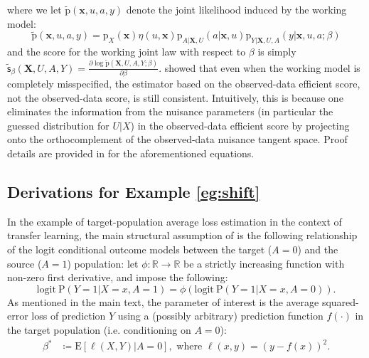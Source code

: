 \documentclass{article}
\def\logit{\mathrm{logit}}
\def\bfX{\mathbf{X}}
\def\bfx{\mathbf{x}}
\def\sfs{\mathsf{s}}
\theoremstyle{plain}
\theoremstyle{definition}
\theoremstyle{remark}
\def\P{\mathrm{P}}
\def\E{\mathrm{E}}
\def\tilde{\widetilde}
\def\p{\mathrm{p}}
\def\bbR{\mathbb{R}}
\begin{document}
where we let $\tilde{\p} (\bfx, u, a, y)$ denote the joint likelihood induced by the working model:
$$\tilde{\p} (\bfx, u, a, y) = \p_{X} (\bfx) \eta (u, \bfx) \p_{A | \bfX, U} (a | \bfx, u) \p_{Y | \bfX, U, A} (y | \bfx, u, a; \beta)$$ 
and the score for the working joint law with respect to $\beta$ is simply $\tilde{\sfs}_{\beta} (\bfX, U, A, Y) = \frac{\partial \log \tilde{\p} (\bfX, U, A, Y; \beta)}{\partial \beta}$.
\citet{zhang2022semi} showed that even when the working model is completely misspecified, the estimator based on the observed-data efficient score, not the observed-data score, is still consistent. Intuitively, this is because one eliminates the information from the nuisance parameters (in particular the guessed distribution for $U | X$) in the observed-data efficient score by projecting onto the orthocomplement of the observed-data nuisance tangent space. Proof details are provided in \citet{zhang2022semi} for the aforementioned equations.

\subsection{Derivations for Example \ref{eg:shift}}
\label{app:Proof_transfer}

In the example of target-population average loss estimation in the context of transfer learning, the main structural assumption of \citet{qiu2023efficient} is the following relationship of the logit conditional outcome models between the target ($A = 0$) and the source ($A = 1$) population: let $\phi: \bbR \rightarrow \bbR$ be a strictly increasing function with non-zero first derivative, and \citet{qiu2023efficient} impose the following:
\begin{equation}
\label{constraint}
\logit \ \P (Y = 1 | X = x, A = 1) = \phi \left(\logit \ \P (Y = 1 | X = x, A = 0) \right).
\end{equation}
As mentioned in the main text, the parameter of interest is the average squared-error loss of prediction $Y$ using a (possibly arbitrary) prediction function $f (\cdot)$ in the target population (i.e. conditioning on $A = 0$):
\begin{equation*}
\begin{split}
\beta^* & \coloneqq \E [\ell(X,Y) | A=0], \text{ where } \ell(x,y) = (y- f (x))^2.
\end{split}
\end{equation*}
\end{document}
